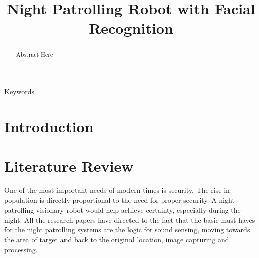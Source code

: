 \documentclass[journal]{IEEEtran}
\begin{document}

\title{Night Patrolling Robot with Facial Recognition}

\author{
}

\maketitle

\begin{abstract}
	Abstract Here
\end{abstract}

\begin{IEEEkeywords}
	Keywords
\end{IEEEkeywords}

\section{Introduction}

\section{Literature Review}
One of the most important needs of modern times is
security. The rise in population is directly proportional
to the need for proper security. A night patrolling
visionary robot would help achieve certainty, especially
during the night. All the research papers have directed
to the fact that the basic must-haves for the night
patrolling systems are the logic for sound sensing,
moving towards the area of target and back to the
original location, image capturing and processing.\\
\end{document}
